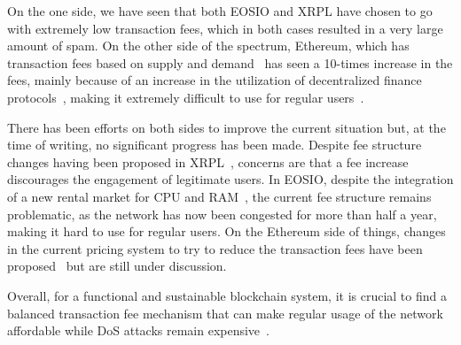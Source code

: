 On the one side, we have seen that both EOSIO and XRPL have chosen to go with extremely low transaction fees, which in both cases resulted in a very large amount of spam.
On the other side of the spectrum, Ethereum, which has transaction fees based on supply and demand~\cite{wood2014} has seen a 10-times increase in the fees, mainly because of an increase in the utilization of decentralized finance protocols~\cite{gudgeon2020decentralized}, making it extremely difficult to use for regular users~\cite{eth-defi-gas}.

There has been efforts on both sides to improve the current situation but, at the time of writing, no significant progress has been made.
Despite fee structure changes having been proposed in XRPL~\cite{xrp-fees}, concerns are that a fee increase discourages the engagement of legitimate users.
In EOSIO, despite the integration of a new rental market for CPU and RAM~\cite{eos-rental-market}, the current fee structure remains problematic, as the network has now been congested for more than half a year, making it hard to use for regular users.
On the Ethereum side of things, changes in the current pricing system to try to reduce the transaction fees have been proposed~\cite{eip-1559} but are still under discussion.

Overall, for a functional and sustainable blockchain system, it is crucial to find a balanced transaction fee mechanism that can make regular usage of the network affordable while DoS attacks remain expensive~\cite{perez2020f}.
